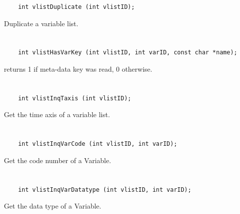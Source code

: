 \begin{verbatim}
    int vlistDuplicate (int vlistID);
\end{verbatim}

Duplicate a variable list.


\section*{\tt {}}

\begin{verbatim}
    int vlistHasVarKey (int vlistID, int varID, const char *name);
\end{verbatim}

returns 1 if meta-data key was read, 0 otherwise.


\section*{\tt {}}

\begin{verbatim}
    int vlistInqTaxis (int vlistID);
\end{verbatim}

Get the time axis of a variable list.


\section*{\tt {}}

\begin{verbatim}
    int vlistInqVarCode (int vlistID, int varID);
\end{verbatim}

Get the code number of a Variable.


\section*{\tt {}}

\begin{verbatim}
    int vlistInqVarDatatype (int vlistID, int varID);
\end{verbatim}

Get the data type of a Variable.


\section*{\tt {}}

